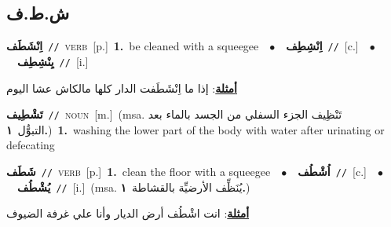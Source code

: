 \documentclass[10pt,a4paper,twoside]{article} %
\begin{document}
\begin{multicols}{2}
\vspace{-3mm}
\subsection*{\color{blue}\foreignlanguage{arabic}{ش.ط.ف}\color{blue}{}} 

{\setlength\topsep{0pt}\textbf{\foreignlanguage{arabic}{اِنْشَطَف}}\ {\color{gray}\texttt{//}\color{black}}\ \textsc{verb}\ [p.]\ \textbf{1.}~be cleaned with a squeegee\ \ $\bullet$\ \ \setlength\topsep{0pt}\textbf{\foreignlanguage{arabic}{اِنْشِطِف}}\ {\color{gray}\texttt{//}\color{black}}\ [c.]\ \ $\bullet$\ \ \setlength\topsep{0pt}\textbf{\foreignlanguage{arabic}{يِنْشِطِف}}\ {\color{gray}\texttt{//}\color{black}}\ [i.]\  \begin{flushright}\color{gray}\foreignlanguage{arabic}{\textbf{\underline{\foreignlanguage{arabic}{أمثلة}}}: إذا ما اِنْشَطَفت الدار كلها مالكاش عشا اليوم}\end{flushright}\color{black}} \vspace{2mm}

{\setlength\topsep{0pt}\textbf{\foreignlanguage{arabic}{تَشْطِيف}}\ {\color{gray}\texttt{//}\color{black}}\ \textsc{noun}\ [m.]\ \color{gray}(msa. \foreignlanguage{arabic}{تَنْظِيف الجزء السفلي من الجسد بالماء بعد التبوُّل}~\foreignlanguage{arabic}{\textbf{١.}})\color{black}\ \textbf{1.}~washing the lower part of the body with water after urinating or defecating\ } \vspace{2mm}

{\setlength\topsep{0pt}\textbf{\foreignlanguage{arabic}{شَطَف}}\ {\color{gray}\texttt{//}\color{black}}\ \textsc{verb}\ [p.]\ \textbf{1.}~clean the floor with a squeegee\ \ $\bullet$\ \ \setlength\topsep{0pt}\textbf{\foreignlanguage{arabic}{اُشْطُف}}\ {\color{gray}\texttt{//}\color{black}}\ [c.]\ \ $\bullet$\ \ \setlength\topsep{0pt}\textbf{\foreignlanguage{arabic}{يُشْطُف}}\ {\color{gray}\texttt{//}\color{black}}\ [i.]\ \color{gray}(msa. \foreignlanguage{arabic}{يُنَظِّف الأرضيِّة بالقشاطة}~\foreignlanguage{arabic}{\textbf{١.}})\color{black}\  \begin{flushright}\color{gray}\foreignlanguage{arabic}{\textbf{\underline{\foreignlanguage{arabic}{أمثلة}}}: انت اشْطُف أرض الديار وأنا علي غرفة الضيوف}\end{flushright}\color{black}} \vspace{2mm}


\end{multicols}
\end{document}
